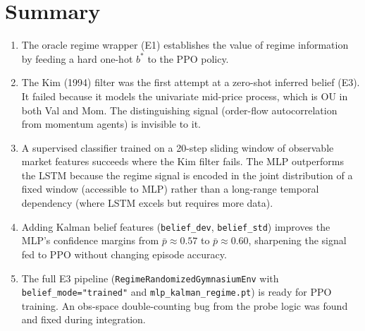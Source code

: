 \documentclass[11pt]{article}
\begin{document}
\section{Summary}

\begin{enumerate}
  \item The oracle regime wrapper (E1) establishes the value of regime
        information by feeding a hard one-hot $b^*$ to the PPO policy.

  \item The Kim (1994) filter was the first attempt at a zero-shot inferred
        belief (E3).  It failed because it models the univariate mid-price
        process, which is OU in both Val and Mom.  The distinguishing signal
        (order-flow autocorrelation from momentum agents) is invisible to it.

  \item A supervised classifier trained on a 20-step sliding window of
        observable market features succeeds where the Kim filter fails.
        The MLP outperforms the LSTM because the regime signal is encoded in
        the joint distribution of a fixed window (accessible to MLP) rather
        than a long-range temporal dependency (where LSTM excels but requires
        more data).

  \item Adding Kalman belief features (\texttt{belief\_dev}, \texttt{belief\_std})
        improves the MLP's confidence margins from $\bar{p} \approx 0.57$ to
        $\bar{p} \approx 0.60$, sharpening the signal fed to PPO without
        changing episode accuracy.

  \item The full E3 pipeline (\texttt{RegimeRandomizedGymnasiumEnv} with
        \texttt{belief\_mode="trained"} and \texttt{mlp\_kalman\_regime.pt})
        is ready for PPO training.  An obs-space double-counting bug from the
        probe logic was found and fixed during integration.
\end{enumerate}
\end{document}
